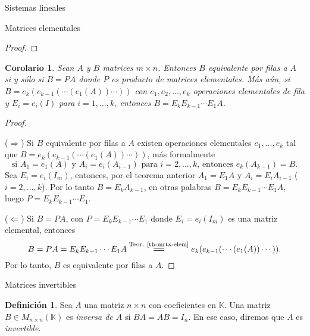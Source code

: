 \documentclass[a4paper,12pt,twoside,spanish]{amsbook}
\newtheorem{corolario}[teorema]{Corolario}
\theoremstyle{definition}
\newtheorem{definicion}{Definici\'on}[section]
\theoremstyle{remark}
\newcommand{\K}{\mathbb K}
\begin{document}
\begin{chapter}{Sistemas lineales}
\begin{section}{Matrices elementales}
\begin{proof}
	
			\end{proof}
			
			
			
			
			\begin{corolario}\label{coro-mrtx-elem}
				Sean $A$ y $B$ matrices $m \times n$. Entonces $B$ equivalente por filas a $A$ si y sólo si $B=PA$ donde $P$ es  producto de matrices elementales. Más aún, si $B = e_k(e_{k-1}(\cdots(e_1(A))\cdots))$ con $e_1,e_2,\ldots,e_k$ operaciones elementales de fila y $E_i=e_i(I)$ para $i=1,\ldots,k$,  entonces $B =  E_kE_{k-1}\cdots E_1A$.
			\end{corolario}
			\begin{proof} 
				\
				
				($\Rightarrow$) Si $B$ equivalente por filas a $A$  existen operaciones elementales $e_1,\ldots,e_k$ tal que $B = e_k(e_{k-1}(\cdots(e_1(A))\cdots))$, más formalmente
				\begin{equation*}
				\text{si } A_1 = e_1(A)\text{ y } A_i = e_i(A_{i-1})\text{ para }i=2,\ldots,k\text{, entonces } e_k(A_{k-1})= B.
				\end{equation*}
				Sea $E_i = e_i(I_m)$, entonces, por el teorema anterior $A_1= E_1A$ y $A_i = E_iA_{i-1}$ ($i=2,\ldots,k$). Por  lo tanto $B=E_kA_{k-1}$, en otras palabras $B =  E_kE_{k-1}\cdots E_1A$, luego $P = E_kE_{k-1}\cdots E_1$.
				
				($\Leftarrow$) Si $B= PA$, con  $P = E_kE_{k-1}\cdots E_1$ donde $E_i=e_i(I_m)$ es una matriz elemental,  entonces
				$$
				B = PA = E_kE_{k-1}\cdots E_1A \stackrel{\text{Teor. \ref{th-mrtx-elem}}}{=\joinrel=}  e_k(e_{k-1}(\cdots(e_1(A))\cdots)). 
				$$
				Por lo tanto, $B$ es equivalente por filas a $A$.
			\end{proof} 
			
		\end{section}
		
		\begin{section}{Matrices invertibles}
			\begin{definicion} Sea $A$ una  matriz $n \times n$ con coeficientes en $\K$. Una matriz $B \in M_{n\times n}(\K)$  es \textit{inversa  de $A$} si $BA=AB=I_n$. En  ese caso,  diremos que  $A$ es \textit{invertible}.
			\end{definicion}
			

\end{section}
\end{chapter}
\end{document}
